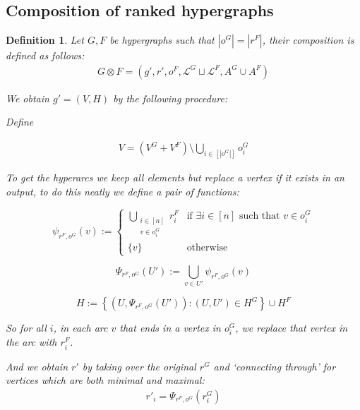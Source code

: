 \documentclass[12pt]{article}
\newtheorem{definition}{Definition}[section]
\newcommand{\defeq}{\vcentcolon=}
\newcommand{\1}{\mathbbm{1}}
\renewcommand{\L}{\mathcal{L}}
\begin{document}
\subsection{Composition of ranked hypergraphs}
\begin{definition}
Let $G, F$ be hypergraphs such that $|o^G| = |r^F|$, their composition is defined as follows:
\begin{align}
    G\otimes F = (g', r', o^F, \L^G\sqcup \L^F, A^G\cup A^F)
\end{align}

We obtain $g' = (V,H)$ by the following procedure:

Define 

\begin{align*}
    V = (V^G + V^F) \setminus \bigcup_{i\in [|o^G|]}o^G_i
\end{align*}

To get the hyperarcs we keep all elements but replace a vertex if it exists in an output, to do this neatly we define a pair of functions:

\[
\psi_{r^F, o^G}(v) := 
\begin{cases}
\displaystyle\bigcup_{\substack{i \in [n] \\ v \in o^G_i}} r^F_i & \text{if } \exists i \in [n] \text{ such that } v \in o^G_i \\
\{v\} & \text{otherwise}
\end{cases}
\]

\[
\Psi_{r^F, o^G}(U') := \bigcup_{v \in U'} \psi_{r^F, o^G}(v)
\]

\[
H := \left\{ \left(U, \Psi_{r^F, o^G}(U')\right) : (U, U') \in H^G \right\} \cup H^F
\]

So for all $i$, in each arc $v$ that ends in a vertex in $o_i^G$, we replace that vertex in the arc with $r_i^F$. 

And we obtain $r'$ by taking over the original $r^G$ and `connecting through' for vertices which are both minimal and maximal:
\begin{align*}
    r'_i = \Psi_{r^F, o^G}(r^G_i)
\end{align*}
\end{definition}
\end{document}
